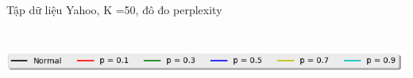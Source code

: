 \documentclass[pdf]{beamer}
\begin{document}
\begin{frame}{Tập dữ liệu Yahoo, K =50, đô đo perplexity}
\begin{columns}[T]
\begin{column}{.50\textwidth}
\begin{figure}
\end{figure}				
\end{column} %
\end{columns}
\begin{center}
\includegraphics[width=1\textwidth]{menu.png}	
\end{center}
\end{frame}
\end{document}
